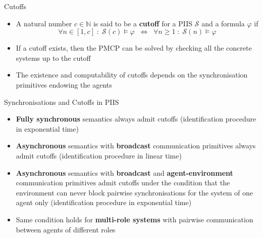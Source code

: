 \documentclass[10pt]{beamer}
\begin{document}
\begin{frame}{Cutoffs} 
 
\begin{itemize} \itemsep 2em
    \item A natural number   $c \in \mathbb{N}$ is said to be
        a {\bf cutoff} for a PIIS $\mathcal{S}$ and a formula $\varphi$ if
  \[ 
        \forall n \in [1, c]  \; \colon \; \mathcal{S}(c) \models \varphi \;\;
   \Leftrightarrow \;\; \forall n \geq 1 \; \colon  \;
    \mathcal{S}(n) \models \varphi
 \]

\item  If a cutoff exists, then the PMCP can be solved by checking  all
    the concrete systems up to the cutoff


\item  The existence and computability of cutoffs depends on the
    synchronisation primitives endowing the agents
\end{itemize}


\end{frame}



\begin{frame}{Synchronisations and Cutoffs in PIIS}
 
\begin{itemize}  \itemsep 2em

        \item {\bf Fully synchronous} semantics always admit cutoffs (identification procedure in exponential time)


    \item {\bf Asynchronous} semantics with {\bf broadcast} communication
        primitives always admit cutoffs (identification procedure in linear time)
        
    \item {\bf Asynchronous} semantics with {\bf broadcast} and {\bf
        agent-environment} communication primitives admit cutoffs under the
        condition  that the environment can never block pairwise
        synchronisations for the system of one agent only (identification
        procedure in exponential time)

    
    \item Same condition holds for {\bf multi-role systems} with 
        pairwise communication between agents of different roles

\end{itemize}


\end{frame}
\end{document}
